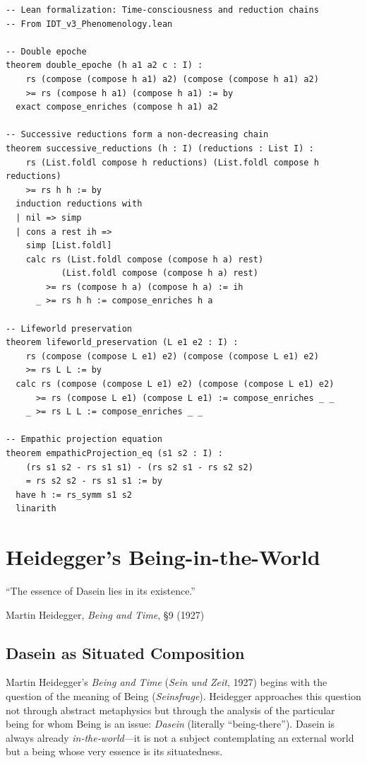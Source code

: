 \begin{lstlisting}
-- Lean formalization: Time-consciousness and reduction chains
-- From IDT_v3_Phenomenology.lean

-- Double epoche
theorem double_epoche (h a1 a2 c : I) :
    rs (compose (compose h a1) a2) (compose (compose h a1) a2)
    >= rs (compose h a1) (compose h a1) := by
  exact compose_enriches (compose h a1) a2

-- Successive reductions form a non-decreasing chain
theorem successive_reductions (h : I) (reductions : List I) :
    rs (List.foldl compose h reductions) (List.foldl compose h reductions)
    >= rs h h := by
  induction reductions with
  | nil => simp
  | cons a rest ih =>
    simp [List.foldl]
    calc rs (List.foldl compose (compose h a) rest)
           (List.foldl compose (compose h a) rest)
        >= rs (compose h a) (compose h a) := ih
      _ >= rs h h := compose_enriches h a

-- Lifeworld preservation
theorem lifeworld_preservation (L e1 e2 : I) :
    rs (compose (compose L e1) e2) (compose (compose L e1) e2)
    >= rs L L := by
  calc rs (compose (compose L e1) e2) (compose (compose L e1) e2)
      >= rs (compose L e1) (compose L e1) := compose_enriches _ _
    _ >= rs L L := compose_enriches _ _

-- Empathic projection equation
theorem empathicProjection_eq (s1 s2 : I) :
    (rs s1 s2 - rs s1 s1) - (rs s2 s1 - rs s2 s2)
    = rs s2 s2 - rs s1 s1 := by
  have h := rs_symm s1 s2
  linarith
\end{lstlisting}




\chapter{Heidegger's Being-in-the-World}
\label{ch:heidegger}

\epigraph{``The essence of Dasein lies in its existence.''}{Martin Heidegger, \textit{Being and Time}, \S9 (1927)}

\section{Dasein as Situated Composition}

Martin Heidegger's \textit{Being and Time} (\textit{Sein und Zeit}, 1927)
begins with the question of the meaning of Being (\textit{Seinsfrage}).
Heidegger approaches this question not through abstract metaphysics but through
the analysis of the particular being for whom Being is an issue: \emph{Dasein}
(literally ``being-there''). Dasein is always already \emph{in-the-world}---it
is not a subject contemplating an external world but a being whose very essence
is its situatedness.

